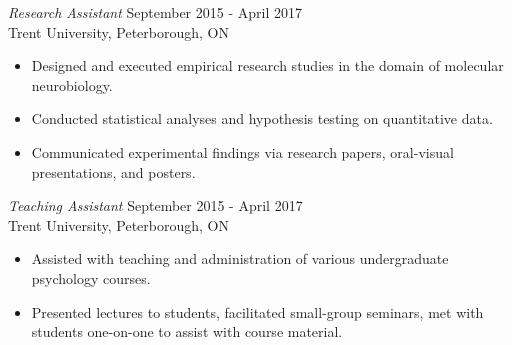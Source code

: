 \documentclass[10pt]{res} %
\begin{document}
\begin{resume}
{\sl Research Assistant} \hfill September 2015 - April 2017 \\
Trent University, Peterborough, ON 
\begin{itemize} \itemsep -2pt %
    \item Designed and executed empirical research studies in the domain of molecular neurobiology.
    \item Conducted statistical analyses and hypothesis testing on quantitative data.
    \item Communicated experimental findings via research papers, oral-visual presentations, and posters.
\end{itemize}

{\sl Teaching Assistant} \hfill September 2015 - April 2017 \\
Trent University, Peterborough, ON 
\begin{itemize} \itemsep -2pt %
    \item Assisted with teaching and administration of various undergraduate psychology courses.
    \item Presented lectures to students, facilitated small-group seminars, met with students one-on-one to assist with course material. 
\end{itemize}






\end{resume}
\end{document}
